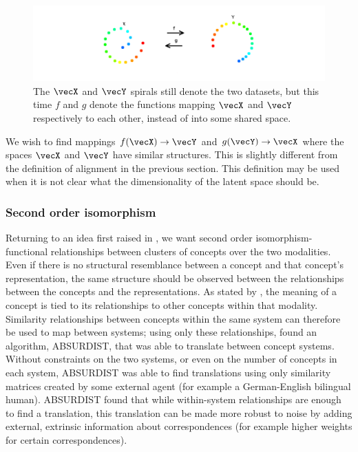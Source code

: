 \begin{figure}[H]
\label{fig:alignment2}
    \centering
    \includegraphics[width=\textwidth]{images/review/alignment2.png}
    \caption{
        The $\vecX$ and $\vecY$ spirals still denote the two datasets, but this time $f$ and $g$ denote the functions mapping $\vecX$ and $\vecY$ respectively to each other, instead of into some shared space.
    }
\end{figure}

We wish to find mappings $f(\vecX) \rightarrow \vecY$ and $g(\vecY) \rightarrow \vecX$ where the spaces $\vecX$ and $\vecY$  have similar structures. This is slightly different from the definition of alignment in the previous section. This definition may be used when it is not clear what the dimensionality of the latent space should be. 

\subsubsection{Second order isomorphism}

Returning to an idea first raised in \cite{SHEPARD19701}, we want second order isomorphism- functional relationships between clusters of concepts over the two modalities. Even if there is no structural resemblance between a concept and that concept's representation, the same structure should be observed between the relationships between the concepts  and the representations. As stated by \cite{GOLDSTONE2002295}, the meaning of a concept is tied to its relationships to other concepts within that modality. Similarity relationships between concepts within the same system can therefore be used to map between systems; using only these relationships, \cite{GOLDSTONE2002295} found an algorithm, ABSURDIST, that was able to translate between concept systems. Without constraints on the two systems, or even on the number of concepts in each system, ABSURDIST was able to find translations using only similarity matrices created by some external agent (for example a German-English bilingual human). ABSURDIST found that while within-system relationships are enough to find a translation, this translation can be made more robust to noise by adding external, extrinsic information about correspondences (for example higher weights for certain correspondences). 


